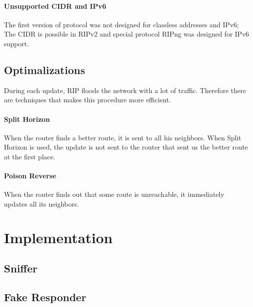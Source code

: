 \documentclass[10pt,a4paper,titlepage]{article}
\begin{document}
            \paragraph{Unsupported CIDR and IPv6}
                The first version of protocol was not designed for classless addresses and IPv6; The CIDR is possible in RIPv2
                and special protocol RIPng was designed for IPv6 support. 
        
        \subsection{Optimalizations}
            During each update, RIP floods the network with a lot of traffic. Therefore there are techniques that makes this procedure
            more efficient.
            \paragraph{Split Horizon}
                When the router finds a better route, it is sent to all his neighbors. When Split Horizon is used, the update is
                not sent to the router that sent us the better route at the first place.
            \paragraph{Poison Reverse} 
                When the router finds out that some route is unreachable, it immediately updates all its neighbors. \cite{RIPJuniper}
                \cite{RIPGuide} \cite{RIPWikipedia} \cite{computernetworking} \cite{mistrovstvivsitich}

    \section{Implementation}
        
        \subsection{Sniffer}
        
            
        \subsection{Fake Responder}
        
    
\end{document}
